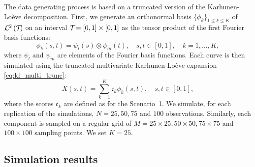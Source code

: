 \begin{scenario}
The data generating process is based on a truncated version of the Karhunen-Loève decomposition. First, we generate an orthonormal basis $\{\phi_k\}_{1 \leq k \leq K}$ of $\mathcal{L}^{2}\left(\mathcal{T}_{}\right)$ on an interval $\mathcal{T}_{} = [0, 1] \times [0, 1]$ as the tensor product of the first Fourier basis functions:
\begin{equation}
    \phi_k(s, t) = \psi_l(s) \otimes \psi_m(t), \quad s, t \in [0, 1],\quad k = 1, \dots, K,
\end{equation}
where $\psi_l$ and $\psi_m$ are elements of the Fourier basis functions.
Each curve is then simulated using the truncated multivariate Karhunen-Loève expansion \eqref{eq:kl_multi_trunc}:
\begin{equation}
    X(s, t) = \sum_{k = 1}^K \mathfrak{c}_k \phi_k(s, t), \quad s, t \in [0, 1],
\end{equation}
where the scores $\mathfrak{c}_k$ are defined as for the Scenario~1. We simulate, for each replication of the simulations, $N = 25, 50, 75$ and $100$ observations. Similarly, each component is sampled on a regular grid of $M = 25 \times 25, 50 \times 50, 75 \times 75$ and $100 \times 100$ sampling points. We set $K = 25$.
\end{scenario}


\subsection{Simulation results} %
\label{sub:simulation_results}

